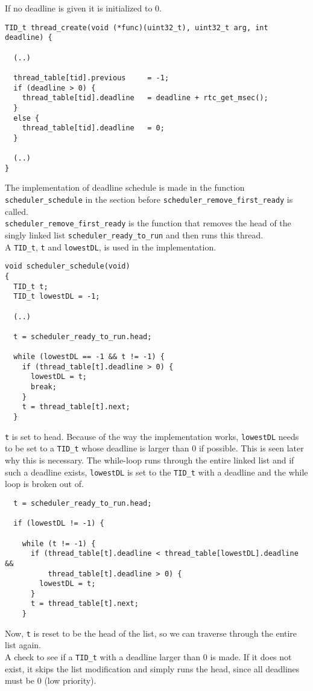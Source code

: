\documentclass[12pt]{article}
\begin{document}
If no deadline is given it is initialized to $0$.
\begin{verbatim}
TID_t thread_create(void (*func)(uint32_t), uint32_t arg, int deadline) {

  (..)
  
  thread_table[tid].previous     = -1;
  if (deadline > 0) {
    thread_table[tid].deadline   = deadline + rtc_get_msec();
  }
  else {
    thread_table[tid].deadline   = 0;
  }
  
  (..)
}
\end{verbatim}
The implementation of deadline schedule is made in the function \texttt{scheduler\_schedule} in the section before \texttt{scheduler\_remove\_first\_ready} is called.\\
\texttt{scheduler\_remove\_first\_ready} is the function that removes the head of the singly linked list \texttt{scheduler\_ready\_to\_run} and then runs this thread.\\
A \texttt{TID\_t}, \texttt{t} and \texttt{lowestDL}, is used in the implementation.
\begin{verbatim}
void scheduler_schedule(void)
{
  TID_t t;
  TID_t lowestDL = -1;
  
  (..)
  
  t = scheduler_ready_to_run.head;
  
  while (lowestDL == -1 && t != -1) {
    if (thread_table[t].deadline > 0) {
      lowestDL = t;
      break;
    }
    t = thread_table[t].next;
  }
\end{verbatim}
\texttt{t} is set to head. Because of the way the implementation works, \texttt{lowestDL} needs to be set to a \texttt{TID\_t} whose deadline is larger than $0$ if possible. This is seen later why this is necessary. The while-loop runs through the entire linked list and if such a deadline exists, \texttt{lowestDL} is set to the \texttt{TID\_t} with a deadline and the while loop is broken out of.
\begin{verbatim}
  t = scheduler_ready_to_run.head;

  if (lowestDL != -1) {

    while (t != -1) {
      if (thread_table[t].deadline < thread_table[lowestDL].deadline &&
          thread_table[t].deadline > 0) {
        lowestDL = t;
      }
      t = thread_table[t].next;
    }
\end{verbatim}
Now, \texttt{t} is reset to be the head of the list, so we can traverse through the entire list again.\\
A check to see if a \texttt{TID\_t} with a deadline larger than $0$ is made. If it does not exist, it skips the list modification and simply runs the head, since all deadlines must be $0$ (low priority).\\
\end{document}
